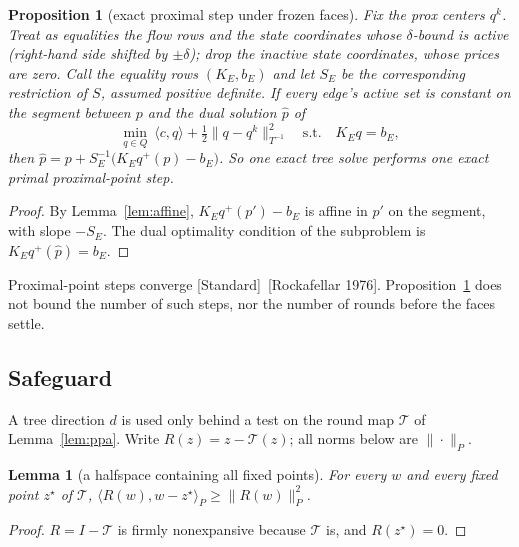 \documentclass[11pt]{article}
\newcommand{\std}{\textcolor{muted}{[Standard]}\ }
\theoremstyle{plain}
\newtheorem{proposition}[theorem]{Proposition}
\newtheorem{lemma}[theorem]{Lemma}
\theoremstyle{definition}
\theoremstyle{remark}
\begin{document}
\begin{proposition}[exact proximal step under frozen faces]\label{prop:newton}
Fix the prox centers $q^k$. Treat as equalities the flow rows and the state coordinates whose $\delta$-bound is active (right-hand side shifted by $\pm\delta$); drop the inactive state coordinates, whose prices are zero. Call the equality rows $(K_E,b_E)$ and let $S_E$ be the corresponding restriction of $S$, assumed positive definite. If every edge's active set is constant on the segment between $p$ and the dual solution $\hat p$ of
\[
\min_{q\in Q}\ \langle c,q\rangle+\tfrac12\|q-q^k\|^2_{T^{-1}}\quad\text{s.t.}\quad K_Eq=b_E,
\]
then $\hat p=p+S_E^{-1}\big(K_Eq^+(p)-b_E\big)$. So one exact tree solve performs one exact primal proximal-point step.
\end{proposition}
\begin{proof}
By Lemma~\ref{lem:affine}, $K_Eq^+(p')-b_E$ is affine in $p'$ on the segment, with slope $-S_E$. The dual optimality condition of the subproblem is $K_Eq^+(\hat p)=b_E$.
\end{proof}
Proximal-point steps converge \std[Rockafellar 1976]. Proposition~\ref{prop:newton} does not bound the number of such steps, nor the number of rounds before the faces settle.

\subsection{Safeguard}\label{sec:safeguard}
A tree direction $d$ is used only behind a test on the round map $\mathcal T$ of Lemma~\ref{lem:ppa}. Write $R(z)=z-\mathcal T(z)$; all norms below are $\|\cdot\|_P$.

\begin{lemma}[a halfspace containing all fixed points]\label{lem:halfspace}
For every $w$ and every fixed point $z^\star$ of $\mathcal T$, $\langle R(w),w-z^\star\rangle_P\ge\|R(w)\|_P^2$.
\end{lemma}
\begin{proof}
$R=I-\mathcal T$ is firmly nonexpansive because $\mathcal T$ is, and $R(z^\star)=0$.
\end{proof}
\end{document}
